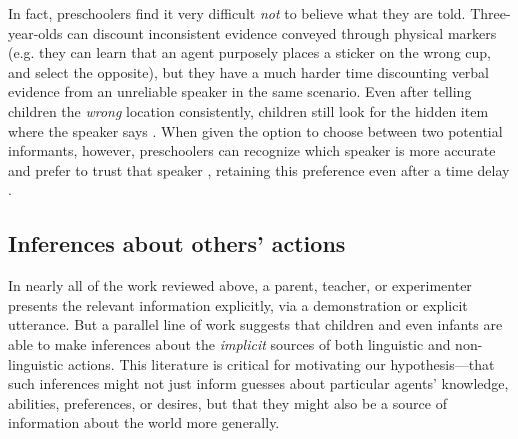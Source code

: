 \documentclass[man]{apa2}
\begin{document}
In fact, preschoolers find it very difficult \emph{not} to believe what they are told.  Three-year-olds can discount inconsistent evidence conveyed through physical markers (e.g. they can learn that an agent purposely places a sticker on the wrong cup, and select the opposite), but they have a much harder time discounting verbal evidence from an unreliable speaker in the same scenario. Even after telling children the \emph{wrong} location consistently, children still look for the hidden item where the speaker says \cite{jaswal2010}.  When given the option to choose between two potential informants, however, preschoolers can recognize which speaker is more accurate and prefer to trust that speaker \cite{pasquini2007}, retaining this preference even after a time delay \cite{corriveau2009}.  



\subsection{Inferences about others' actions}


In nearly all of the work reviewed above, a parent, teacher, or experimenter presents the relevant information explicitly, via a demonstration or explicit utterance. But a parallel line of work suggests that children and even infants are able to make inferences about the \emph{implicit} sources of both linguistic and non-linguistic actions. This literature is critical for motivating our hypothesis---that such inferences might not just inform guesses about particular agents' knowledge, abilities, preferences, or desires, but that they might also be a source of information about the world more generally. 


\end{document}
